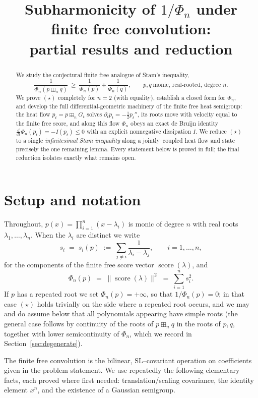 \documentclass[12pt]{article}
\title{Subharmonicity of $1/\Phi_n$ under finite free convolution:\\
partial results and reduction}
\author{}
\date{}
\theoremstyle{remark}
\DeclareMathOperator{\score}{score}
\newcommand{\boxp}{\boxplus_n}
\begin{document}
\maketitle

\begin{abstract}
We study the conjectural finite free analogue of Stam's inequality,
\[
\frac{1}{\Phi_n(p\boxp q)}\ \ge\ \frac{1}{\Phi_n(p)}+\frac{1}{\Phi_n(q)},
\qquad p,q\ \text{monic, real-rooted, degree }n. \tag{$\star$}
\]
We prove $(\star)$ completely for $n=2$ (with equality), establish a closed
form for $\Phi_n$, and develop the full differential-geometric machinery of
the finite free heat semigroup: the heat flow $p_t=p\boxp G_t$ solves
$\partial_t p_t=-\tfrac12 p_t''$, its roots move with velocity equal to the
finite free score, and along this flow $\Phi_n$ obeys an exact de Bruijn
identity $\frac{d}{dt}\Phi_n(p_t)=-I(p_t)\le 0$ with an explicit
nonnegative dissipation $I$.  We reduce $(\star)$ to a single
\emph{infinitesimal Stam inequality} along a jointly--coupled heat flow and
state precisely the one remaining lemma.  Every statement below is proved in
full; the final reduction isolates exactly what remains open.
\end{abstract}

\section{Setup and notation}

Throughout, $p(x)=\prod_{i=1}^n(x-\lambda_i)$ is monic of degree $n$ with real
roots $\lambda_1,\dots,\lambda_n$.  When the $\lambda_i$ are distinct we write
\[
s_i \;=\; s_i(p)\;:=\;\sum_{j\neq i}\frac{1}{\lambda_i-\lambda_j},
\qquad i=1,\dots,n,
\]
for the components of the finite free score vector $\score(\lambda)$, and
\[
\Phi_n(p)\;=\;\|\score(\lambda)\|^2\;=\;\sum_{i=1}^n s_i^2 .
\]
If $p$ has a repeated root we set $\Phi_n(p)=+\infty$, so that $1/\Phi_n(p)=0$;
in that case $(\star)$ holds trivially on the side where a repeated root
occurs, and we may and do assume below that all polynomials appearing have
simple roots (the general case follows by continuity of the roots of
$p\boxp q$ in the roots of $p,q$, together with lower semicontinuity of
$\Phi_n$, which we record in Section~\ref{sec:degenerate}).

The finite free convolution is the bilinear, $\mathrm{SL}$--covariant operation
on coefficients given in the problem statement.  We use repeatedly the
following elementary facts, each proved where first needed:
translation/scaling covariance, the identity element $x^n$, and the existence
of a Gaussian semigroup.
\end{document}
